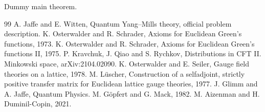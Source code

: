 

\setcounter{section}{2}
\begin{theorem}\label{thm:main}Dummy main theorem.\end{theorem}
\label{zz:start}

\label{zz:end}
\begin{thebibliography}{99}
 A. Jaffe and E. Witten, Quantum Yang--Mills theory, official problem description.
 K. Osterwalder and R. Schrader, Axioms for Euclidean Green's functions, 1973.
 K. Osterwalder and R. Schrader, Axioms for Euclidean Green's functions II, 1975.
 P. Kravchuk, J. Qiao and S. Rychkov, Distributions in CFT II. Minkowski space, arXiv:2104.02090.
 K. Osterwalder and E. Seiler, Gauge field theories on a lattice, 1978.
 M. L\"uscher, Construction of a selfadjoint, strictly positive transfer matrix for Euclidean lattice gauge theories, 1977.
 J. Glimm and A. Jaffe, Quantum Physics.
 M. G\"opfert and G. Mack, 1982.
 M. Aizenman and H. Duminil-Copin, 2021.
\end{thebibliography}

